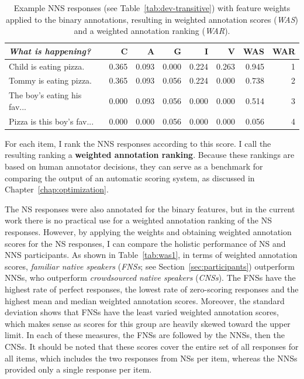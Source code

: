\begin{table}[htb!]
\begin{center}
\begin{tabular}{|l||r|r|r|r|r||r|r|}
\hline
\textit{What is happening?} & C & A & G & I & V & WAS & WAR \\
\hline
\hline
Child is eating pizza. & 0.365 & 0.093 & 0.000 & 0.224 & 0.263 & 0.945 & 1 \\
\hline
Tommy is eating pizza. & 0.365 & 0.093 & 0.056 & 0.224 & 0.000 & 0.738 & 2 \\
\hline
The boy's eating his fav... & 0.000 & 0.093 & 0.056 & 0.000 & 0.000 & 0.514 & 3 \\
\hline
Pizza is this boy's fav... & 0.000 & 0.000 & 0.056 & 0.000 & 0.000 & 0.056 & 4 \\
\hline
\end{tabular}
\caption{\label{tab:applied-weights} Example NNS responses (see Table~\ref{tab:dev-transitive}) with feature weights applied to the binary annotations, resulting in weighted annotation scores (\textit{WAS}) and a weighted annotation ranking (\textit{WAR}).}
\end{center}
\end{table}

For each item, I rank the NNS responses according to this score. I call the resulting ranking a \textbf{weighted annotation ranking}. Because these rankings are based on human annotator decisions, they can serve as a benchmark for comparing the output of an automatic scoring system, as discussed in Chapter~\ref{chap:optimization}.

The NS responses were also annotated for the binary features, but in the current work there is no practical use for a weighted annotation ranking of the NS responses. However, by applying the weights and obtaining weighted annotation scores for the NS responses, I can compare the holistic performance of NS and NNS participants. As shown in Table~\ref{tab:was1}, in terms of weighted annotation scores, \textit{familiar native speakers} (\textit{FNSs}; see Section~\ref{sec:participants}) outperform NNSs, who outperform \textit{crowdsourced native speakers} (\textit{CNSs}). The FNSs have the highest rate of perfect responses, the lowest rate of zero-scoring responses and the highest mean and median weighted annotation scores. Moreover, the standard deviation shows that FNSs have the least varied weighted annotation scores, which makes sense as scores for this group are heavily skewed toward the upper limit. In each of these measures, the FNSs are followed by the NNSs, then the CNSs. It should be noted that these scores cover the entire set of all responses for all items, which includes the two responses from NSs per item, whereas the NNSs provided only a single response per item.


